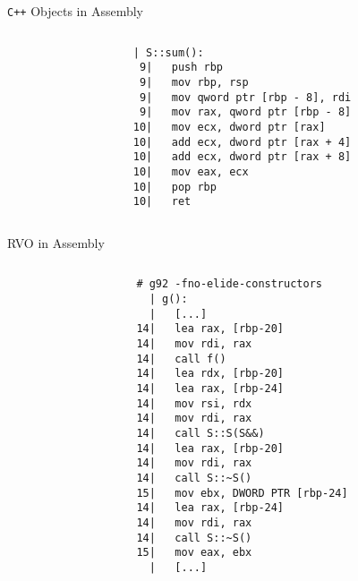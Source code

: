 \begin{frame}[fragile]{\texttt{C++} Objects in Assembly}
    \begin{columns}[t]
        \begin{column}{.45\textwidth}
        \end{column}
        \begin{column}{.45\textwidth}
            \begin{lstlisting}[language={},morekeywords={rdi},numbers=none]
  | S::sum():
 9|   push rbp
 9|   mov rbp, rsp
 9|   mov qword ptr [rbp - 8], rdi
 9|   mov rax, qword ptr [rbp - 8]
10|   mov ecx, dword ptr [rax]
10|   add ecx, dword ptr [rax + 4]
10|   add ecx, dword ptr [rax + 8]
10|   mov eax, ecx
10|   pop rbp
10|   ret
            \end{lstlisting}
        \end{column}
    \end{columns}
\end{frame}

\begin{frame}[fragile]{RVO in Assembly}
    \begin{columns}[t]
        \begin{column}{.45\textwidth}
        \end{column}
        \begin{column}{.45\textwidth}
            \begin{lstlisting}[language={},morekeywords={rdi},numbers=none]
# g92 -fno-elide-constructors
  | g():
  |   [...]
14|   lea rax, [rbp-20]
14|   mov rdi, rax
14|   call f()
14|   lea rdx, [rbp-20]
14|   lea rax, [rbp-24]
14|   mov rsi, rdx
14|   mov rdi, rax
14|   call S::S(S&&)
14|   lea rax, [rbp-20]
14|   mov rdi, rax
14|   call S::~S()
15|   mov ebx, DWORD PTR [rbp-24]
14|   lea rax, [rbp-24]
14|   mov rdi, rax
14|   call S::~S()
15|   mov eax, ebx
  |   [...]      
            \end{lstlisting}
        \end{column}
    \end{columns}
\end{frame}

